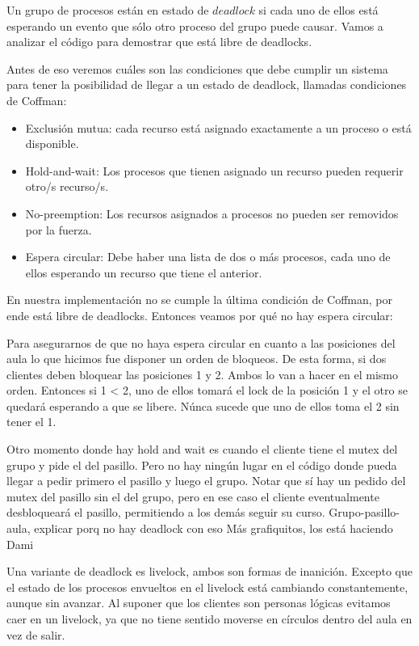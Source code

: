 \label{sec:deadlock}
Un grupo de procesos están en estado de $deadlock$ si cada uno de ellos está esperando un evento que sólo otro proceso del grupo puede causar.
Vamos a analizar el código para demostrar que está libre de deadlocks.

Antes de eso veremos cuáles son las condiciones que debe cumplir un sistema para tener la posibilidad de llegar a un estado de deadlock, llamadas
condiciones de Coffman:
\begin{itemize}
 \item Exclusión mutua: cada recurso está asignado exactamente a un proceso o está disponible.
 \item Hold-and-wait: Los procesos que tienen asignado un recurso pueden requerir otro/s recurso/s.
 \item No-preemption: Los recursos asignados a procesos no pueden ser removidos por la fuerza.
 \item Espera circular: Debe haber una lista de dos o más procesos, cada uno de ellos esperando un recurso que tiene el anterior.
\end{itemize}

En nuestra implementación no se cumple la última condición de Coffman, por ende está libre de deadlocks.
Entonces veamos por qué no hay espera circular:

Para asegurarnos de que no haya espera circular en cuanto a las posiciones del aula lo que hicimos fue disponer un orden de bloqueos.
De esta forma, si dos clientes deben bloquear las posiciones 1 y 2. Ambos lo van a hacer en el mismo orden. Entonces si 1 < 2, uno de ellos tomará el lock
de la posición 1 y el otro se quedará esperando a que se libere. Núnca sucede que uno de ellos toma el 2 sin tener el 1.

Otro momento donde hay hold and wait es cuando el cliente tiene el mutex del grupo y pide el del pasillo. Pero no hay ningún lugar en el código donde 
pueda llegar a pedir primero el pasillo y luego el grupo. Notar que sí hay un pedido del mutex del pasillo sin el del grupo, pero en ese caso
el cliente eventualmente desbloqueará el pasillo, permitiendo a los demás seguir su curso.
Grupo-pasillo-aula, explicar porq no hay deadlock con eso
Más grafiquitos, los está haciendo Dami

Una variante de deadlock es livelock, ambos son formas de inanición. Excepto que el estado de los procesos envueltos en el livelock está cambiando constantemente,
aunque sin avanzar. Al suponer que los clientes son personas lógicas evitamos caer en un livelock, ya que no tiene sentido moverse en círculos dentro del aula
en vez de salir. %